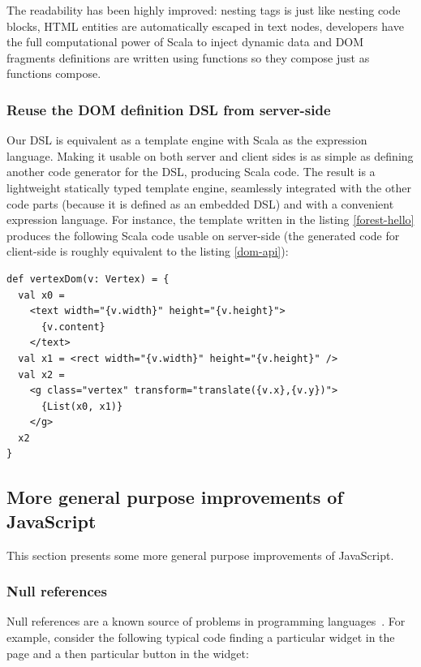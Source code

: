 \documentclass[american,english,runningheads]{llncs}
\begin{document}
The readability has been highly improved: nesting tags is just like nesting code blocks, HTML entities are
automatically escaped in text nodes, developers have the full computational power of Scala to inject dynamic data and
DOM fragments definitions are written using functions so they compose just as functions compose.

\subsubsection{Reuse the DOM definition DSL from server-side}

Our DSL is equivalent as a template engine with Scala as the expression language. Making it usable on both server and
client sides is as simple as defining another code generator for the DSL, producing Scala code. The result is a
lightweight statically typed template engine, seamlessly integrated with the other code parts (because it is defined
as an embedded DSL) and with a convenient expression language. For instance, the template written in the listing
\ref{forest-hello} produces the following Scala code usable on server-side (the generated code for client-side is
roughly equivalent to the listing \ref{dom-api}):

\begin{lstlisting}
def vertexDom(v: Vertex) = {
  val x0 =
    <text width="{v.width}" height="{v.height}">
      {v.content}
    </text>
  val x1 = <rect width="{v.width}" height="{v.height}" />
  val x2 =
    <g class="vertex" transform="translate({v.x},{v.y})">
      {List(x0, x1)}
    </g>
  x2
}
\end{lstlisting}

\subsection{More general purpose improvements of JavaScript}

This section presents some more general purpose improvements of JavaScript.

\subsubsection{Null references}

Null references are a known source of problems in programming languages~\cite{Hoare09_Null,Nanda09_Null}. For
example, consider the following typical code finding a particular widget in the page and a then particular button in
the widget:
\end{document}
